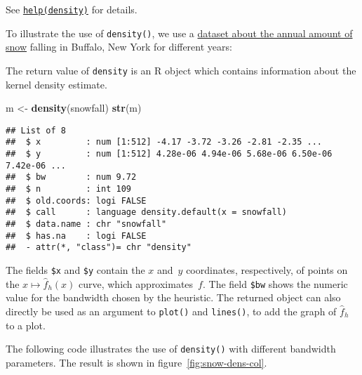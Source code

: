 \documentclass[
  a4paper,
]{article}
\newenvironment{Shaded}{\begin{snugshade}}{\end{snugshade}}
\newcommand{\CommentTok}[1]{\textcolor[rgb]{0.56,0.35,0.01}{\textit{#1}}}
\newcommand{\FunctionTok}[1]{\textcolor[rgb]{0.13,0.29,0.53}{\textbf{#1}}}
\newcommand{\NormalTok}[1]{#1}
\newcommand{\OtherTok}[1]{\textcolor[rgb]{0.56,0.35,0.01}{#1}}
\newcommand{\SpecialCharTok}[1]{\textcolor[rgb]{0.81,0.36,0.00}{\textbf{#1}}}
\newcommand{\StringTok}[1]{\textcolor[rgb]{0.31,0.60,0.02}{#1}}
\theoremstyle{definition}
\theoremstyle{definition}
\theoremstyle{definition}
\theoremstyle{definition}
\theoremstyle{remark}
\begin{document}
See \href{https://rdrr.io/r/stats/density.html}{\texttt{help(density)}} for details.

To illustrate the use of \texttt{density()}, we use a
\href{https://teaching.seehuhn.de/data/buffalo/}{dataset about the annual amount of snow}
falling in Buffalo, New York for different years:

\begin{Shaded}
\end{Shaded}

The return value of \texttt{density} is an R object which contains information
about the kernel density estimate.

\begin{Shaded}
\begin{Highlighting}[]
\NormalTok{m }\OtherTok{\textless{}{-}} \FunctionTok{density}\NormalTok{(snowfall)}
\FunctionTok{str}\NormalTok{(m)}
\end{Highlighting}
\end{Shaded}

\begin{verbatim}
## List of 8
##  $ x         : num [1:512] -4.17 -3.72 -3.26 -2.81 -2.35 ...
##  $ y         : num [1:512] 4.28e-06 4.94e-06 5.68e-06 6.50e-06 7.42e-06 ...
##  $ bw        : num 9.72
##  $ n         : int 109
##  $ old.coords: logi FALSE
##  $ call      : language density.default(x = snowfall)
##  $ data.name : chr "snowfall"
##  $ has.na    : logi FALSE
##  - attr(*, "class")= chr "density"
\end{verbatim}

The fields \texttt{\$x} and \texttt{\$y} contain the \(x\) and~\(y\) coordinates, respectively,
of points on the \(x \mapsto \hat f_h(x)\) curve, which approximates~\(f\).
The field \texttt{\$bw} shows the numeric value for the bandwidth chosen by
the heuristic. The returned object can also directly be used
as an argument to \texttt{plot()} and \texttt{lines()}, to add the graph of \(\hat f_h\)
to a plot.

The following code illustrates the use of \texttt{density()} with different bandwidth
parameters. The result is shown in figure~\ref{fig:snow-dens-col}.
\end{document}
